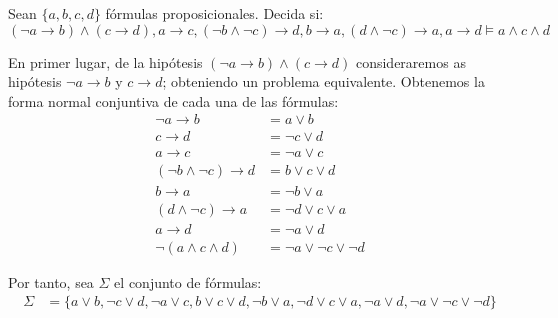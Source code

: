 \begin{ejercicio} \label{ej:1.3.7}
    Sean $\{a,b,c,d\}$ fórmulas proposicionales. Decida si:
    \begin{equation*}
        (\lnot a\rightarrow b)\land (c\rightarrow d),a\rightarrow c,(\lnot b\land \lnot c)\rightarrow d,b\rightarrow a,(d\land \lnot c)\rightarrow a,a\rightarrow d\models a\land c\land d
    \end{equation*}

    En primer lugar, de la hipótesis $(\lnot a\rightarrow b)\land (c\rightarrow d)$ consideraremos as hipótesis $\lnot a\rightarrow b$ y $c\rightarrow d$; obteniendo un problema equivalente.
    Obtenemos la forma normal conjuntiva de cada una de las fórmulas:
    \begin{align*}
        \lnot a\rightarrow b &= a\lor b\\
        c\rightarrow d &= \lnot c\lor d\\
        a\rightarrow c &= \lnot a\lor c\\
        (\lnot b\land \lnot c)\rightarrow d &= b\lor c\lor d\\
        b\rightarrow a &= \lnot b\lor a\\
        (d\land \lnot c)\rightarrow a &= \lnot d\lor c\lor a\\
        a\rightarrow d &= \lnot a\lor d\\
        \lnot (a\land c\land d) &= \lnot a\lor \lnot c\lor \lnot d
    \end{align*}

    Por tanto, sea $\Sigma$ el conjunto de fórmulas:
    \begin{align*}
        \Sigma &= \{a\lor b, \lnot c\lor d, \lnot a\lor c, b\lor c\lor d, \lnot b\lor a, \lnot d\lor c\lor a, \lnot a\lor d, \lnot a\lor \lnot c\lor \lnot d\}
    \end{align*}


\end{ejercicio}

